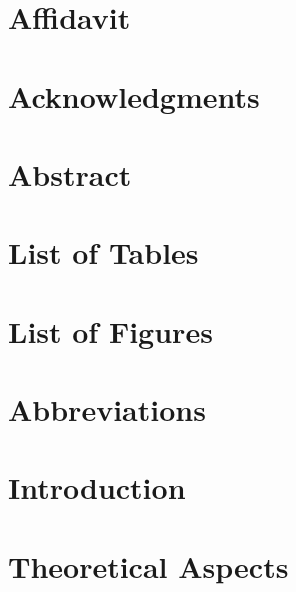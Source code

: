 \documentclass[a4paper,10pt,twoside]{report}
\author{\me}
\begin{document}


\normalsize

\chapter*{Affidavit}\label{chapter:Affidavit}
\setcounter{page}{0}



\chapter*{Acknowledgments}\label{chapter:Acknowledgments }



\chapter*{Abstract}\label{chapter:Abstract}



\tableofcontents

\chapter*{List of Tables}\label{chapter:List of Tables}


\chapter*{List of Figures}\label{chapter:List of Figures}


\chapter*{Abbreviations}\label{chapter:Abbreviations}


\chapter{Introduction}\label{chapter:Introduction}
\setcounter{page}{0}



\chapter{Theoretical Aspects}\label{chapter:Theory}

\end{document}
